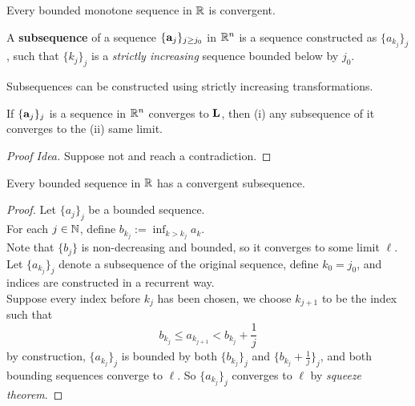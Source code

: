 \documentclass[11pt]{article}
\begin{document}
		    \begin{theorem}
		    	Every bounded monotone sequence in $\mathbb{R}$ is convergent.
		    \end{theorem}
		    
		    \begin{definition}
		    		A \textbf{subsequence} of a sequence $\{\textbf{a}_j\}_{j \geq j_0}$ in $\mathbb{R}^n$ is a sequence constructed as $\{a_{k_j}\}_j$, such that $\{k_j\}_j$ is a \emph{strictly increasing} sequence bounded below by $j_0$.
		    \end{definition}
		    
		    \begin{remark}
		    		Subsequences can be constructed using strictly increasing transformations.
		    \end{remark}
		    
		    \begin{proposition}
			    	If $\{\textbf{a}_j\}_j$ is a sequence in $\mathbb{R}^n$ converges to $\textbf{L}$, then (i) any subsequence of it converges to the (ii) same limit.
			    	\begin{proof}[Proof Idea]
			    		Suppose not and reach a contradiction.
			    	\end{proof}
		    \end{proposition}
		    
		    \begin{theorem}
		    		Every bounded sequence in $\mathbb{R}$ has a convergent subsequence.
		    		\begin{proof}
		    			Let $\{a_j\}_j$ be a bounded sequence. \\
		    			For each $j \in \mathbb{N}$, define $b_{k_j} := \inf_{k > k_j} a_k$. \\
		    			Note that $\{b_j\}$ is non-decreasing and bounded, so it converges to some limit $\ell$. \\
		    			Let $\{a_{k_j}\}_j$ denote a subsequence of the original sequence, define $k_0 = j_0$, and indices are constructed in a recurrent way. \\
		    			Suppose every index before $k_j$ has been chosen, we choose $k_{j+1}$  to be the index such that 
		    			\begin{equation}
		    				b_{k_j} \leq a_{k_{j+1}} < b_{k_j} + \frac{1}{j}
		    			\end{equation}
		    			by construction, $\{a_{k_j}\}_j$ is bounded by both $\{b_{k_j}\}_j$ and $\{b_{k_j} + \frac{1}{j}\}_j$, and both bounding sequences converge to $\ell$. So $\{a_{k_j}\}_j$ converges to $\ell$ by \emph{squeeze theorem}.
		    		\end{proof}
		    \end{theorem}
		    
\end{document}
